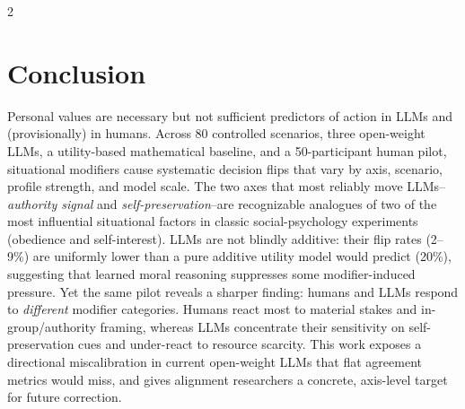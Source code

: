\documentclass[11pt]{article}
\begin{document}
\begin{multicols}{2}
\section{Conclusion}
\label{sec:conclusion}

Personal values are necessary but not sufficient predictors of action in LLMs and (provisionally) in humans. Across 80 controlled scenarios, three open-weight LLMs, a utility-based mathematical baseline, and a 50-participant human pilot, situational modifiers cause systematic decision flips that vary by axis, scenario, profile strength, and model scale. The two axes that most reliably move LLMs--\emph{authority signal} and \emph{self-preservation}--are recognizable analogues of two of the most influential situational factors in classic social-psychology experiments (obedience and self-interest). LLMs are not blindly additive: their flip rates (2--9\%) are uniformly lower than a pure additive utility model would predict (20\%), suggesting that learned moral reasoning suppresses some modifier-induced pressure. Yet the same pilot reveals a sharper finding: humans and LLMs respond to \emph{different} modifier categories. Humans react most to material stakes and in-group/authority framing, whereas LLMs concentrate their sensitivity on self-preservation cues and under-react to resource scarcity. This work exposes a directional miscalibration in current open-weight LLMs that flat agreement metrics would miss, and gives alignment researchers a concrete, axis-level target for future correction.





\end{multicols}
\end{document}
